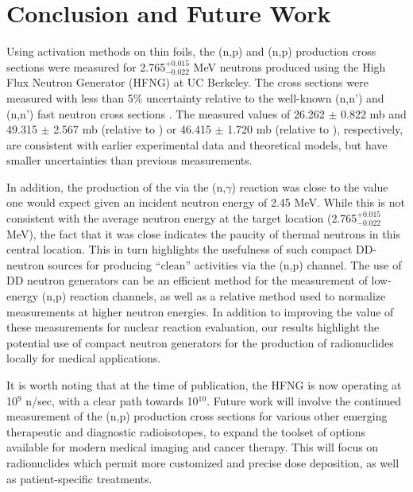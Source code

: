 \documentclass[5p]{elsarticle}
\begin{document}
 
 
 
 \section{Conclusion and Future Work}

Using activation methods on thin foils, the (n,p) and (n,p) production cross sections were measured for  2.765$^{+0.015}_{-0.022}$ MeV neutrons produced using the High Flux Neutron Generator (HFNG) at UC Berkeley.
The cross sections were measured with less than  5\% uncertainty relative to the well-known (n,n') and (n,n') fast neutron cross sections \cite{Capote2012,zsolnay2012technical}.
The measured values of  26.262 $\pm$  0.822 mb and  49.315 $\pm$ 2.567 mb (relative to ) or 46.415 $\pm$ 1.720 mb (relative to ), respectively, are consistent with earlier experimental data and theoretical models, but have smaller uncertainties than previous measurements.
 
 In addition, the   production of the   via the (n,$\gamma$) reaction was close to the value one would expect given an incident neutron energy of 2.45 MeV.  
 While this is not consistent with the average neutron energy at the target location (2.765$^{+0.015}_{-0.022}$ MeV), the fact that it was close indicates the paucity of thermal neutrons in this central location.  
 This in turn highlights the usefulness of such compact DD-neutron sources  for producing \enquote{clean} activities via the (n,p) channel.  
The use of DD neutron generators can be an efficient method for the measurement of low-energy (n,p) reaction channels, as well as a relative method used to normalize measurements at higher neutron energies.
 In addition to improving the value of these measurements for nuclear reaction evaluation, our results highlight the potential use of compact neutron generators for the production of radionuclides locally for medical applications.


 It is worth noting that at the time of publication, the  HFNG is now operating at 10$^9$ n/sec, with
a clear path towards 10$^{10}$.
 Future work will involve the continued measurement of the (n,p) production cross sections for various other emerging therapeutic and diagnostic radioisotopes, to expand the toolset of options available for modern medical imaging and cancer therapy.
This will focus on radionuclides which permit more customized and precise dose deposition, as well as patient-specific treatments.
 
\end{document}

